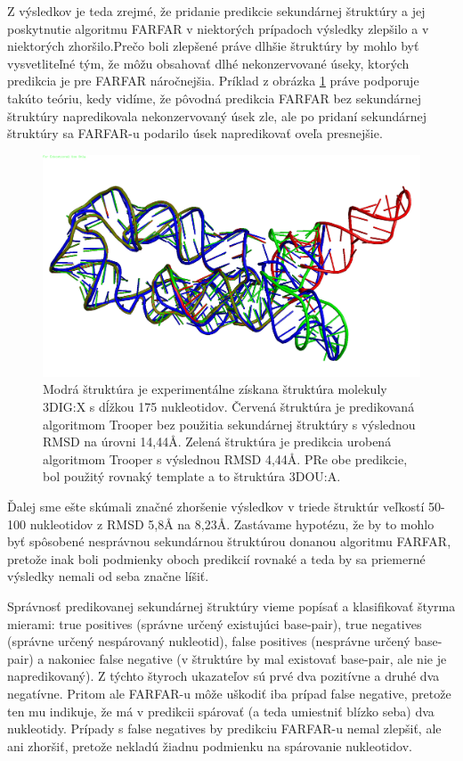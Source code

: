 \indent Z výsledkov je teda zrejmé, že pridanie predikcie sekundárnej štruktúry a jej poskytnutie algoritmu FARFAR v niektorých prípadoch výsledky zlepšilo a v niektorých zhoršilo.Prečo boli zlepšené práve dlhšie štruktúry by mohlo byť vysvetliteľné tým, že môžu obsahovať dlhé nekonzervované úseky, ktorých predikcia je pre FARFAR náročnejšia. Príklad z obrázka \ref{obr5.1} práve podporuje takúto teóriu, kedy vidíme, že pôvodná predikcia FARFAR bez sekundárnej štruktúry napredikovala nekonzervovaný úsek zle, ale po pridaní sekundárnej štruktúry sa FARFAR-u podarilo úsek napredikovať oveľa presnejšie.
\begin{figure}%
\includegraphics[width=\textwidth]{../img/struct1}
\caption{Modrá štruktúra je experimentálne získana štruktúra molekuly 3DIG:X s dĺžkou 175 nukleotidov. Červená štruktúra je predikovaná algoritmom Trooper bez použitia sekundárnej štruktúry s výslednou RMSD na úrovni 14,44Å. Zelená štruktúra je predikcia urobená algoritmom Trooper s výslednou RMSD 4,44Å. PRe obe predikcie, bol použitý rovnaký template a to štruktúra 3DOU:A.}
\label{obr5.1}
\end{figure}


\indent Ďalej sme ešte skúmali značné zhoršenie výsledkov v triede štruktúr veľkostí 50-100 nukleotidov z RMSD 5,8Å na 8,23Å. Zastávame hypotézu, že by to mohlo byť spôsobené nesprávnou sekundárnou štruktúrou donanou algoritmu FARFAR, pretože inak boli podmienky oboch predikcií rovnaké a teda by sa priemerné výsledky nemali  od seba značne líšiť.


\indent Správnosť predikovanej sekundárnej štruktúry vieme popísať a klasifikovať štyrma mierami: true positives (správne určený existujúci base-pair), true negatives (správne určený nespárovaný nukleotid), false positives (nesprávne určený base-pair) a nakoniec false negative (v štruktúre by mal existovať base-pair, ale nie je napredikovaný). Z týchto štyroch ukazateľov sú prvé dva pozitívne a druhé dva negatívne. Pritom ale FARFAR-u môže uškodiť iba prípad false negative, pretože ten mu indikuje, že má v predikcii spárovať (a teda umiestniť blízko seba) dva nukleotidy. Prípady s false negatives by predikciu FARFAR-u nemal zlepšiť, ale ani zhoršiť, pretože nekladú žiadnu podmienku na spárovanie nukleotidov. 


